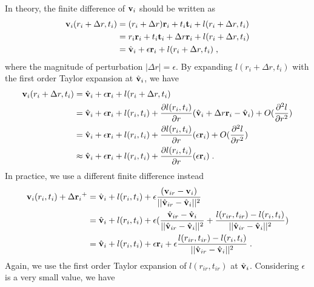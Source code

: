In theory, the finite difference of $\mathbf{v}_i$ should be written as
\begin{align*}
    \mathbf{v}_i(r_i + \Delta r,t_i) 
    &= (r_i + \Delta r)\mathbf{r}_i + t_i\mathbf{t}_i + l(r_i + \Delta r,t_i) \\
    &= {r_i}{\mathbf{r}_i} + {t_i}{\mathbf{t}_i} + \Delta r{\mathbf{r}_i} + l({r_i} + \Delta r,{t_i}) \\
    &= {\hat{\mathbf{v}}_i} + \epsilon {\mathbf{r}_i} + l({r_i} + \Delta r,{t_i})\;,
\end{align*}
where the magnitude of perturbation $|\Delta r|=\epsilon$.
By expanding $l({r_i} + \Delta r,{t_i})$ with the first order Taylor expansion at $\hat{\mathbf{v}}_i$, we have
\begin{align*}
    {\mathbf{v}_i}({r_i} + \Delta r,{t_i}) 
    &= \hat{\mathbf{v}}_i + \epsilon {\mathbf{r}_i} + l({r_i} + \Delta r,{t_i}) \\
    &= \hat{\mathbf{v}}_i + \epsilon {\mathbf{r}_i} + l({r_i},{t_i}) + {{\partial l({r_i},{t_i})} \over {\partial r}} (\hat{\mathbf{v}}_i + \Delta r \mathbf{r}_i - \hat{\mathbf{v}}_i) + O({{{\partial ^2}l} \over {\partial {r^2}}}) \\
    &= \hat{\mathbf{v}}_i + \epsilon {\mathbf{r}_i} + l({r_i},{t_i}) + {{\partial l({r_i},{t_i})} \over {\partial r}}(\epsilon {\mathbf{r}_i}) + O({{{\partial ^2}l} \over {\partial {r^2}}}) \\
    &\approx \hat{\mathbf{v}}_i + \epsilon {\mathbf{r}_i} + l({r_i},{t_i}) + {{\partial l({r_i},{t_i})} \over {\partial r}}(\epsilon {\mathbf{r}_i}) \;.
\end{align*}
In practice, we use a different finite difference instead
\begin{align*}
     {\mathbf{v}_i}({r_i},{t_i}) + \Delta {\mathbf{r}_i}^ +  
     &= \hat{\mathbf{v}}_i + l({r_i},{t_i}) + \epsilon {( {\mathbf{v}_{ir} - \mathbf{v}_i} ) \over {||{\hat{\mathbf{v}}_{ir}} - {\hat{\mathbf{v}}_i}||^2} } \\
     &= \hat{\mathbf{v}}_i + l({r_i},{t_i}) + \epsilon ({{{\hat{\mathbf{v}}_{ir}} - {\hat{\mathbf{v}}_i}} \over ||{\hat{\mathbf{v}}_{ir}} - {\hat{\mathbf{v}}_i}||^2} + {{l({r_{ir}},{t_{ir}}) - l({r_i},{t_i})} \over {||{\hat{\mathbf{v}}_{ir}} - {\hat{\mathbf{v}}_i}||^2}}) \\
     &= \hat{\mathbf{v}}_i + l({r_i},{t_i}) + \epsilon \mathbf{r}_i + \epsilon {{l({r_{ir}},{t_{ir}}) - l({r_i},{t_i})} \over ||{\hat{\mathbf{v}}_{ir}} - {\hat{\mathbf{v}}_i}||^2} \;.
\end{align*}
Again, we use the first order Taylor expansion of $l({r_{ir}},{t_{ir}})$ at $\hat{\mathbf{v}}_i$. Considering $\epsilon$ is a very small value, we have
